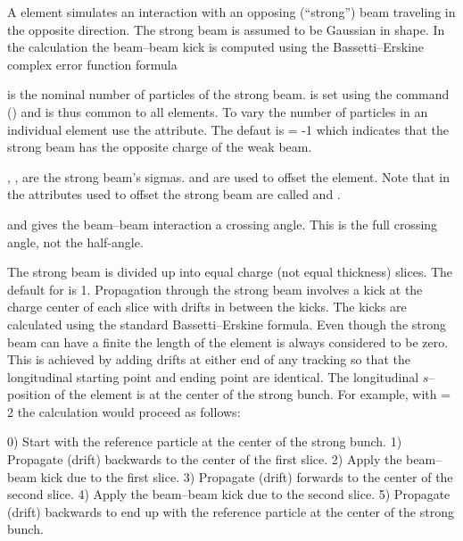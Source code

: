 A  element simulates an interaction with an opposing
(``strong'') beam traveling in the opposite direction. The strong beam
is assumed to be Gaussian in shape. In the 
calculation the beam--beam kick is computed using the
Bassetti--Erskine complex error function formula\cite{b:talman}

 is the nominal number of particles of the strong
beam.  is set using the  command
() and is thus common to all  elements.  To
vary the number of particles in an individual  element use the
 attribute. The defaut is  = -1 which indicates
that the strong beam has the opposite charge of the weak beam.

, ,  are the strong beam's sigmas. 
 and  are used to offset the
 element. Note that in \mad the attributes used to
offset the strong beam are called  and .

 and  gives the beam--beam interaction a
crossing angle. This is the full crossing angle, not the half-angle.

The strong beam is divided up into  equal charge (not equal
thickness) slices. The default for  is 1. Propagation
through the strong beam involves a kick at the charge center of each
slice with drifts in between the kicks. The kicks are calculated using
the standard Bassetti--Erskine formula.  Even though the strong beam can
have a finite  the length of the element is always considered
to be zero. This is achieved by adding drifts at either end of any
tracking so that the longitudinal starting point and ending point are
identical. The longitudinal $s$--position of the
 element is at the center of the strong bunch. For example,
with  = 2 the calculation would proceed as follows:
\begin{example}
  0) Start with the reference particle at the center of the strong bunch.
  1) Propagate (drift) backwards to the center of the first slice.
  2) Apply the beam--beam kick due to the first slice.
  3) Propagate (drift) forwards to the center of the second slice.
  4) Apply the beam--beam kick due to the second slice.
  5) Propagate (drift) backwards to end up with the reference particle
     at the center of the strong bunch.
\end{example}

